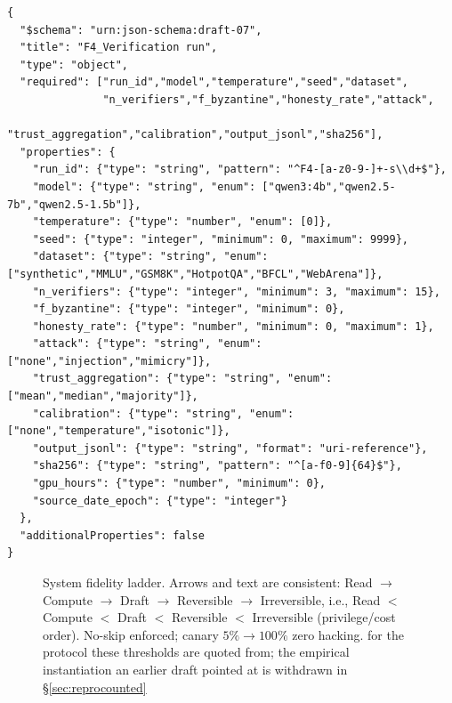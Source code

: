 \documentclass[10pt]{article}
\begin{document}
\begin{lstlisting}[style=jsonstyle,caption={{\tt run.json} JSON Schema (excerpt). Full schema with 18 required fields and 6 optional fields is archived in {\tt evidence/protocol.md}.},label={lst:runjson}]
{
  "$schema": "urn:json-schema:draft-07",
  "title": "F4_Verification run",
  "type": "object",
  "required": ["run_id","model","temperature","seed","dataset",
               "n_verifiers","f_byzantine","honesty_rate","attack",
               "trust_aggregation","calibration","output_jsonl","sha256"],
  "properties": {
    "run_id": {"type": "string", "pattern": "^F4-[a-z0-9-]+-s\\d+$"},
    "model": {"type": "string", "enum": ["qwen3:4b","qwen2.5-7b","qwen2.5-1.5b"]},
    "temperature": {"type": "number", "enum": [0]},
    "seed": {"type": "integer", "minimum": 0, "maximum": 9999},
    "dataset": {"type": "string", "enum": ["synthetic","MMLU","GSM8K","HotpotQA","BFCL","WebArena"]},
    "n_verifiers": {"type": "integer", "minimum": 3, "maximum": 15},
    "f_byzantine": {"type": "integer", "minimum": 0},
    "honesty_rate": {"type": "number", "minimum": 0, "maximum": 1},
    "attack": {"type": "string", "enum": ["none","injection","mimicry"]},
    "trust_aggregation": {"type": "string", "enum": ["mean","median","majority"]},
    "calibration": {"type": "string", "enum": ["none","temperature","isotonic"]},
    "output_jsonl": {"type": "string", "format": "uri-reference"},
    "sha256": {"type": "string", "pattern": "^[a-f0-9]{64}$"},
    "gpu_hours": {"type": "number", "minimum": 0},
    "source_date_epoch": {"type": "integer"}
  },
  "additionalProperties": false
}
\end{lstlisting}

\begin{figure}[ht]\centering
{}
\caption{System fidelity ladder. Arrows and text are consistent: Read $\rightarrow$ Compute $\rightarrow$ Draft $\rightarrow$ Reversible $\rightarrow$ Irreversible, i.e., Read $<$ Compute $<$ Draft $<$ Reversible $<$ Irreversible (privilege/cost order). No-skip enforced; canary $5\%\rightarrow100\%$ zero hacking. for the protocol these thresholds are quoted from; the empirical instantiation an earlier draft pointed at is withdrawn in \S\ref{sec:reprocounted}}
\label{fig:system}
\end{figure}
\end{document}
